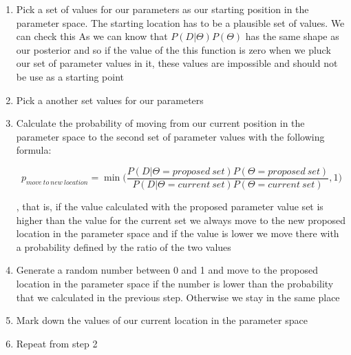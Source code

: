 \documentclass[12pt,a4paper,leqno]{report}
\theoremstyle{plain}
\theoremstyle{definition}
\theoremstyle{remark}
\begin{document}
\begin{enumerate}
    \item Pick a set of values for our parameters as our starting position in the parameter space. The starting
          location has to be a plausible set of values. We can check this As we can know
          that \(P(D|\Theta)P(\Theta)\) has the same shape as our posterior and so if the value of the this function is zero when
          we pluck our set of parameter values in it, these values are impossible and should not be use as a starting point
    \item Pick a another set values for our parameters
    \item Calculate the probability of moving from our current position in the parameter space to the second set of parameter
          values with the following formula:

          \begin{def}\label{randomwalk}
              \begin{equation}
                  p_{move\ to\ new\ location} = \min \bigg(\frac{P(D|\Theta = proposed\ set)P(\Theta = proposed\ set)}{P(D|\Theta = current\ set)P(\Theta = current\ set)}, 1 \bigg)
              \end{equation}
          \end{def}
          , that is, if the value calculated with the proposed parameter value set is higher than the value for the current set
          we always move to the new proposed location in the parameter space and if the value is lower we move there
          with a probability defined by the ratio of the two values

    \item Generate a random number between 0 and 1 and move to the proposed location
          in the parameter space if the number is lower than the probability that we calculated
          in the previous step. Otherwise we stay in the same place
    \item Mark down the values of our current location in the parameter space
    \item Repeat from step 2

\end{enumerate}
\end{document}
